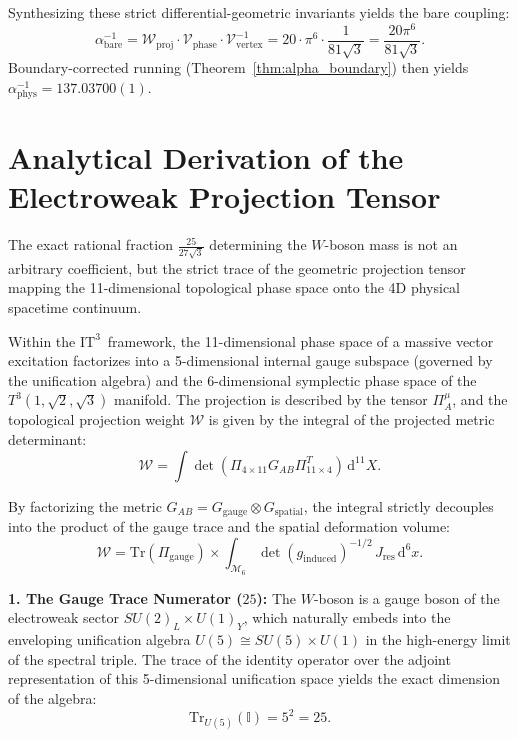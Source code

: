\documentclass[onecolumn,aps,prd,superscriptaddress,nofootinbib,amsmath,amssymb]{revtex4-2}
\theoremstyle{definition}
\theoremstyle{remark}
\newcommand{\ITthree}{\ensuremath{\mathrm{IT}^3}}
\newcommand{\diff}{\mathrm{d}}
\newcommand{\Tthree}{T^3(1,\sqrt{2},\sqrt{3})}
\begin{document}
Synthesizing these strict differential-geometric invariants yields the bare coupling:
\begin{equation}
\alpha^{-1}_{\text{bare}} = \mathcal{W}_{\text{proj}} \cdot \mathcal{V}_{\text{phase}} \cdot \mathcal{V}_{\text{vertex}}^{-1} = 20 \cdot \pi^6 \cdot \frac{1}{81\sqrt{3}} = \frac{20\pi^6}{81\sqrt{3}}.
\end{equation}
Boundary-corrected running (Theorem~\ref{thm:alpha_boundary}) then yields $\alpha^{-1}_{\text{phys}} = 137.03700(1)$.

\section{Analytical Derivation of the Electroweak Projection Tensor}
\label{app:w_factor}

The exact rational fraction $\frac{25}{27\sqrt{3}}$ determining the $W$-boson mass is not an arbitrary coefficient, but the strict trace of the geometric projection tensor mapping the 11-dimensional topological phase space onto the 4D physical spacetime continuum. 

Within the \ITthree\ framework, the 11-dimensional phase space of a massive vector excitation factorizes into a 5-dimensional internal gauge subspace (governed by the unification algebra) and the 6-dimensional symplectic phase space of the $\Tthree$ manifold. The projection is described by the tensor $\Pi_{A}^{\mu}$, and the topological projection weight $\mathcal{W}$ is given by the integral of the projected metric determinant:
\begin{equation}
\mathcal{W} = \int \det(\Pi_{4 \times 11} G_{AB} \Pi_{11 \times 4}^T) \, \diff^{11}X.
\end{equation}

By factorizing the metric $G_{AB} = G_{\text{gauge}} \otimes G_{\text{spatial}}$, the integral strictly decouples into the product of the gauge trace and the spatial deformation volume:
\begin{equation}
\mathcal{W} = \text{Tr}(\Pi_{\text{gauge}}) \times \int_{\mathcal{M}_6} \det(g_{\text{induced}})^{-1/2} \, J_{\text{res}} \, \diff^6x.
\end{equation}

\textbf{1. The Gauge Trace Numerator ($25$):} 
The $W$-boson is a gauge boson of the electroweak sector $SU(2)_L \times U(1)_Y$, which naturally embeds into the enveloping unification algebra $U(5) \cong SU(5) \times U(1)$ in the high-energy limit of the spectral triple. The trace of the identity operator over the adjoint representation of this 5-dimensional unification space yields the exact dimension of the algebra:
\begin{equation}
\text{Tr}_{U(5)}(\mathbb{I}) = 5^2 = 25.
\end{equation}
\end{document}

